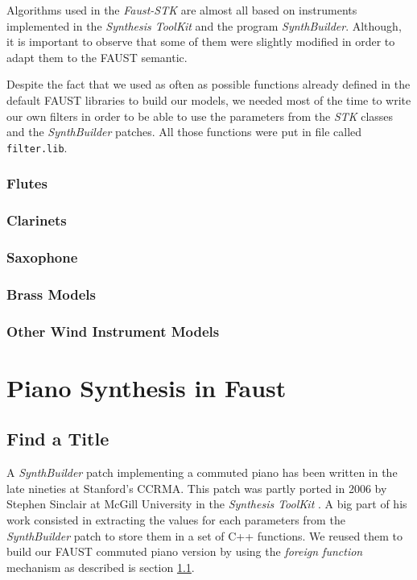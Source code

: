 \documentclass[twoside,a4paper]{article}
\begin{document}
Algorithms used in the {\it Faust-STK} are almost all based on
instruments implemented in the {\it Synthesis ToolKit} and the program
{\it SynthBuilder}. Although, it is important to observe that some of
them were slightly modified in order to adapt them to the FAUST semantic.

Despite the fact that we used as often as possible functions already
defined in the default FAUST libraries to build our models, we needed
most of the time to write our own filters in order to be able to use the
parameters from the {\it STK} classes and the {\it SynthBuilder}
patches. All those functions were put in file called
\texttt{filter.lib}.

\subsubsection{Flutes}

\subsubsection{Clarinets}

\subsubsection{Saxophone}

\subsubsection{Brass Models}

\subsubsection{Other Wind Instrument Models}

\section{Piano Synthesis in Faust} 

\subsection{Find a Title}

A {\it SynthBuilder} patch implementing a commuted piano \cite{commutedPiano} has been
written in the late nineties at Stanford's CCRMA. This patch was partly
ported in 2006 by Stephen Sinclair at McGill University in the {\it
  Synthesis ToolKit} \cite{pianoSTK}. A big part of his work consisted
in extracting the values for each parameters from the {\it
  SynthBuilder} patch to store them in a set of C++ functions. We
reused them to build our FAUST commuted piano version by using the
{\it foreign function} mechanism as described is section \ref{}.
\end{document}
